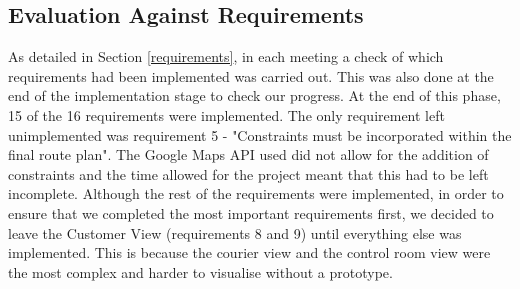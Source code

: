 \subsection{Evaluation Against Requirements}

As detailed in Section \ref{requirements}, in each meeting a check of which requirements had been implemented was carried out. This was also done at the end of the implementation stage to check our progress. At the end of this phase, 15 of the 16 requirements were implemented. The only requirement left unimplemented was requirement 5 - "Constraints must be incorporated within the final route plan". The Google Maps API used did not allow for the addition of constraints and the time allowed for the project meant that this had to be left incomplete. Although the rest of the requirements were implemented, in order to ensure that we completed the most important requirements first, we decided to leave the Customer View (requirements 8 and 9) until everything else was implemented. This is because the courier view and the control room view were the most complex and harder to visualise without a prototype. 